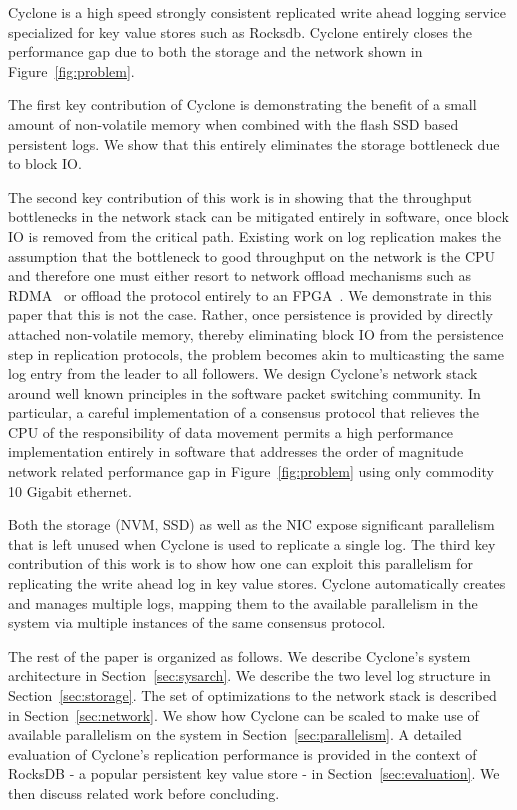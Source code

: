 \documentclass[letterpaper,twocolumn,10pt]{article}
\begin{document}
Cyclone is a high speed strongly consistent replicated write ahead logging
service specialized for key value stores such as Rocksdb. Cyclone entirely
closes the performance gap due to both the storage and the network shown in
Figure~\ref{fig:problem}.

The first key contribution of Cyclone is demonstrating the benefit of a small
amount of non-volatile memory when combined with the flash SSD based persistent
logs. We show that this entirely eliminates the storage bottleneck due to block IO. 
 
The second key contribution of this work is in showing that the
throughput bottlenecks in the network stack can be mitigated entirely
in software, once block IO is removed from the critical path. Existing
work on log replication makes the assumption that the bottleneck to
good throughput on the network is the CPU and therefore one must
either resort to network offload mechanisms such as RDMA~\cite{dare,
  farm, faast} or offload the protocol entirely to an
FPGA~\cite{consensus_box}. We demonstrate in this paper that this is
not the case. Rather, once persistence is provided by directly
attached non-volatile memory, thereby eliminating block IO from the
persistence step in replication protocols, the problem becomes akin to
multicasting the same log entry from the leader to all followers. We
design Cyclone's network stack around well known principles in the
software packet switching community. In particular, a careful
implementation of a consensus protocol that relieves the CPU of the
responsibility of data movement permits a high performance
implementation entirely in software that addresses the order of
magnitude network related performance gap in Figure~\ref{fig:problem}
using only commodity 10 Gigabit ethernet.

Both the storage (NVM, SSD) as well as the NIC expose significant
parallelism that is left unused when Cyclone is used to replicate a
single log. The third key contribution of this work is to show how one
can exploit this parallelism for replicating the write ahead log in
key value stores.  Cyclone automatically creates and manages multiple
logs, mapping them to the available parallelism in the system via
multiple instances of the same consensus protocol.

The rest of the paper is organized as follows. We describe Cyclone's system
architecture in Section~\ref{sec:sysarch}. We describe the two level log
structure in Section~\ref{sec:storage}. The set of optimizations to the network
stack is described in Section~\ref{sec:network}. We show how Cyclone can be
scaled to make use of available parallelism on the system in
Section~\ref{sec:parallelism}. A detailed evaluation of Cyclone's replication
performance is provided in the context of RocksDB - a popular persistent key
value store - in Section~\ref{sec:evaluation}. We then discuss related work
before concluding.
\end{document}
